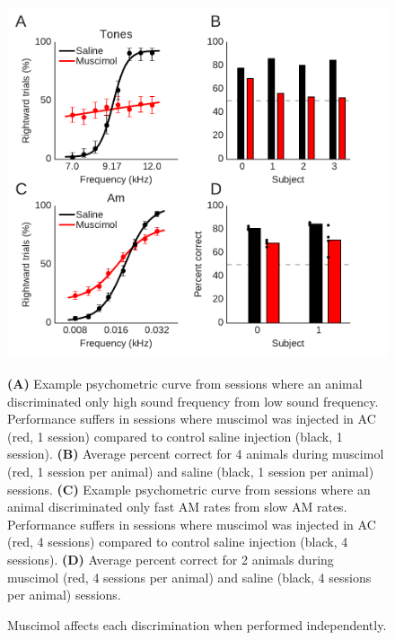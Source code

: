
\begin{figure}[hp] \begin{center}
	\includegraphics[width=6in]{figures/chapter4/figure_single_sound_type}%
\end{center} \caption{Muscimol affects each discrimination when performed
independently.}{\textbf{(A)}  Example psychometric curve from sessions where an
animal discriminated only high sound frequency from low sound frequency.
Performance suffers in sessions where muscimol was injected in AC (red, 1
session) compared to control saline injection (black, 1 session).
%
\textbf{(B)} Average percent correct for 4 animals during muscimol (red, 1
session per animal) and saline (black, 1 session per animal) sessions. 
%
\textbf{(C)} Example psychometric curve from sessions where an animal
discriminated only fast AM rates from slow AM rates. Performance suffers in
sessions where muscimol was injected in AC (red, 4 sessions) compared to
control saline injection (black, 4 sessions).
%
\textbf{(D)} Average percent correct for 2 animals during muscimol (red, 4
sessions per animal) and saline (black, 4 sessions per animal) sessions.  }
\end{figure}


